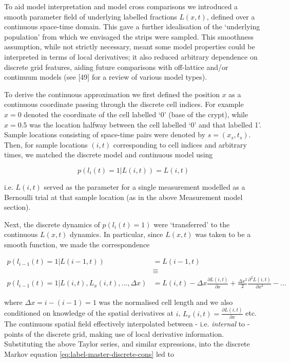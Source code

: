 \documentclass[10pt,letterpaper]{article}
\begin{document}
To aid model interpretation and model cross comparisons we introduced a
smooth parameter field of underlying labelled fractions \(L(x,t)\),
defined over a continuous space-time domain. This gave a further
idealisation of the `underlying population' from which we envisaged the
strips were sampled. This smoothness assumption, while not strictly
necessary, meant some model properties could be interpreted in terms of
local derivatives; it also reduced arbitrary dependence on discrete grid
features, aiding future comparisons with off-lattice and/or continuum
models (see {[}49{]} for a review of various model types).

To derive the continuous approximation we first defined the position
\(x\) as a continuous coordinate passing through the discrete cell
indices. For example \(x = 0\) denoted the coordinate of the cell
labelled `0' (base of the crypt), while \(x = 0.5\) was the location
halfway between the cell labelled `0' and that labelled 1'. Sample
locations consisting of space-time pairs were denoted by
\(s = (x_s,t_s)\). Then, for sample locations \((i,t)\) corresponding to
cell indices and arbitrary times, we matched the discrete model and
continuous model using

\begin{equation}p(l_i(t)=1|L(i,t)) = L(i,t)\label{eq:pop-param}\end{equation}

i.e. \(L(i,t)\) served as the parameter for a single measurement
modelled as a Bernoulli trial at that sample location (as in the above
Measurement model section).

Next, the discrete dynamics of \(p(l_i(t)=1)\) were `transferred' to the
continuous \(L(x,t)\) dynamics. In particular, since \(L(x,t)\) was
taken to be a smooth function, we made the correspondence

\begin{align}p(l_{i-1}(t)=1|L(i-1,t)) &= L(i-1,t) \nonumber \\ &\equiv \nonumber\\ p(l_{i-1}(t)=1|L(i,t),L_x(i,t),...,\Delta x) &= L(i,t)-\Delta x \frac{\partial L(i,t)}{\partial x}+\frac{\Delta x^2}{2} \frac{\partial^2 L(i,t)}{\partial x^2} - ...\end{align}

where \(\Delta x = i-(i-1) = 1\) was the normalised cell length and we
also conditioned on knowledge of the spatial derivatives at \(i\),
\(L_x(i,t) = \frac{\partial L(i,t)}{\partial x}\) etc. The continuous
spatial field effectively interpolated between - i.e. \emph{internal} to
- points of the discrete grid, making use of local derivative
information. Substituting the above Taylor series, and similar
expressions, into the discrete Markov equation
\ref{eq:label-master-discrete-cons} led to
\end{document}
